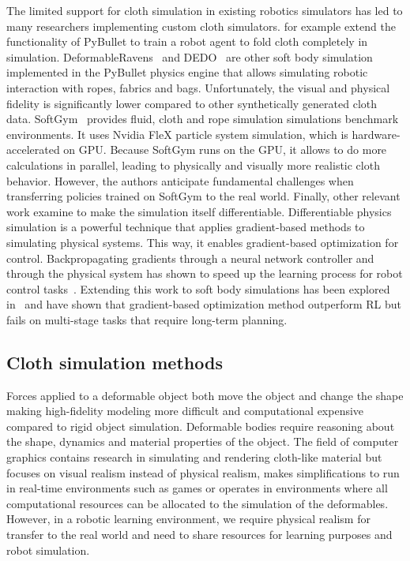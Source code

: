 \documentclass[\home/main.tex]{subfiles}
\begin{document}
The limited support for cloth simulation in existing robotics simulators has led to many researchers implementing custom cloth simulators. \textcite{Matas2018} for example extend the functionality of PyBullet to train a robot agent to fold cloth completely in simulation. DeformableRavens~\autocite{seita2021learning} and DEDO~\autocite{dedo} are other soft body simulation implemented in the PyBullet physics engine that allows simulating robotic interaction with ropes, fabrics and bags. Unfortunately, the visual and physical fidelity is significantly lower compared to other synthetically generated cloth data. SoftGym~\autocite{softgym} provides fluid, cloth and rope simulation simulations benchmark environments. It uses Nvidia FleX particle system simulation, which is hardware-accelerated on GPU. Because SoftGym runs on the GPU, it allows to do more calculations in parallel, leading to physically and visually more realistic cloth behavior. However, the authors anticipate fundamental challenges when transferring policies trained on SoftGym to the real world. Finally, other relevant work examine to make the simulation itself differentiable. Differentiable physics simulation is a powerful technique that applies gradient-based methods to simulating physical systems. This way, it enables gradient-based optimization for control. Backpropagating gradients through a neural network controller and through the physical system has shown to speed up the learning process for robot control tasks~\autocite{Degrave2019}. Extending this work to soft body simulations has been explored in~\autocite{liang2019differentiable,huang2021plasticinelab} and have shown that gradient-based optimization method outperform RL but fails on multi-stage tasks that require long-term planning.

\subsection{Cloth simulation methods} \label{subsec:lit_cloth_sim}

Forces applied to a deformable object both move the object and change the shape making high-fidelity modeling more difficult and computational expensive compared to rigid object simulation. Deformable bodies require reasoning about the shape, dynamics and material properties of the object. The field of computer graphics contains research in simulating and rendering cloth-like material but focuses on visual realism instead of physical realism, makes simplifications to run in real-time environments such as games or operates in environments where all computational resources can be allocated to the simulation of the deformables. However, in a robotic learning environment, we require physical realism for transfer to the real world and need to share resources for learning purposes and robot simulation.  
\end{document}
